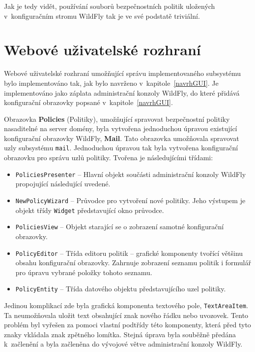 Jak je tedy vidět, používání souborů bezpečnostních politik uložených v~konfiguračním stromu WildFly tak je ve své podstatě triviální.

\section{Webové uživatelské rozhraní}

Webové uživatelské rozhraní umožňující správu implementovaného subsystému bylo implementováno tak, jak bylo navrženo v~kapitole~\ref{navrhGUI}.
Je implementováno jako záplata administrační konzoly WildFly, do které přidává konfigurační obrazovky popsané v~kapitole~\ref{navrhGUI}.


Obrazovka {\bf Policies} (Politiky), umožňující spravovat bezpečnostní politiky nasaditelné na server domény, byla vytvořena jednoduchou úpravou existující konfigurační obrazovky WildFly, {\bf Mail}.
Tato obrazovka umožňovala spravovat uzly subsystému {\tt mail}.
Jednoduchou úpravou tak byla vytvořena konfigurační obrazovku pro správu uzlů politiky.
Tvořena je následujícími třídami:

\begin{itemize}
  \item {\tt PoliciesPresenter} -- Hlavní objekt součásti administrační konzoly WildFly propojující následující uvedené.
  \item {\tt NewPolicyWizard} -- Průvodce pro vytvoření nové politiky. Jeho výstupem je objekt třídy {\tt Widget} představující okno průvodce.
  \item {\tt PoliciesView} -- Objekt starající se o zobrazení samotné konfigurační obrazovky.
  \item {\tt PolicyEditor} -- Třída editoru politik -- grafické komponenty tvořící většinu obsahu konfigurační obrazovky. Zahrnuje zobrazení seznamu politik i formulář pro úpravu vybrané položky tohoto seznamu.
  \item {\tt PolicyEntity} -- Třída datového objektu představujícího uzel politiky.
\end{itemize}

Jedinou komplikací zde byla grafická komponenta textového pole, {\tt TextAreaItem}. Ta neumožňovala uložit text obsahující znak nového řádku nebo uvozovek. Tento problém byl vyřešen za pomoci vlastní podtřídy této komponenty, která před tyto znaky vkládala znak zpětného lomítka. Stejná úprava byla souběžně předána k~začlenění a byla začleněna do vývojové větve administrační konzoly WildFly.~\cite{textareaPullRequest}


